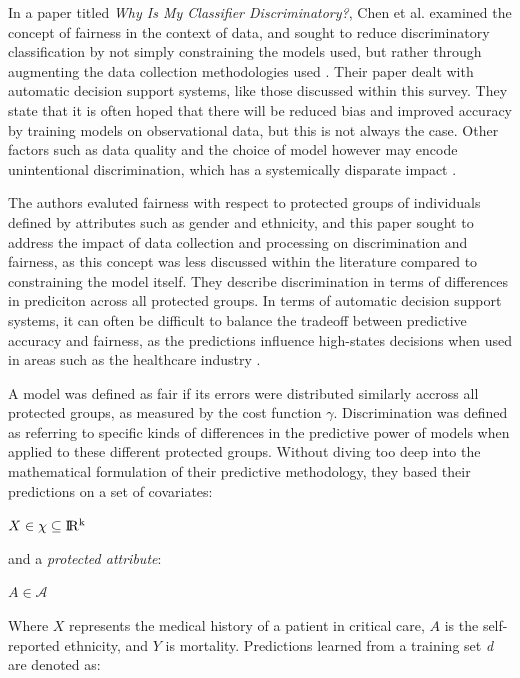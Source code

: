 \documentclass[a4paper]{article}
\begin{document}
In a paper titled \textit{Why Is My Classifier Discriminatory?}, Chen et al. examined the concept of fairness in the context of data, and sought to reduce discriminatory classification by not simply constraining the models used, but rather through augmenting the data collection methodologies used \cite{Chen_2018}. Their paper dealt with automatic decision support systems, like those discussed within this survey. They state that it is often hoped that there will be reduced bias and improved accuracy by training models on observational data, but this is not always the case. Other factors such as data quality and the choice of model however may encode unintentional discrimination, which has a systemically disparate impact \cite{Chen_2018}.

The authors evaluted fairness with respect to protected groups of individuals defined by attributes such as gender and ethnicity, and this paper sought to address the impact of data collection and processing on discrimination and fairness, as this concept was less discussed within the literature compared to constraining the model itself. They describe discrimination in terms of differences in prediciton across all protected groups. In terms of automatic decision support systems, it can often be difficult to balance the tradeoff between predictive accuracy and fairness, as the predictions influence high-states decisions when used in areas such as the healthcare industry \cite{Chen_2018}.

A model was defined as fair if its errors were distributed similarly accross all protected groups, as measured by the cost function $\gamma$. Discrimination was defined as referring to specific kinds of differences in the predictive power of models when applied to these different protected groups. Without diving too deep into the mathematical formulation of their predictive methodology, they based their predictions on a set of covariates:

\begin{center}
    $X \in \chi \subseteq \rm I\!R^k$
\end{center}

\noindent and a \textit{protected attribute}:

\begin{center}
    $A \in \mathcal{A}$
\end{center}

Where $X$ represents the medical history of a patient in critical care, $A$ is the self-reported ethnicity, and $Y$ is mortality. Predictions learned from a training set \textit{d} are denoted as:
\end{document}
